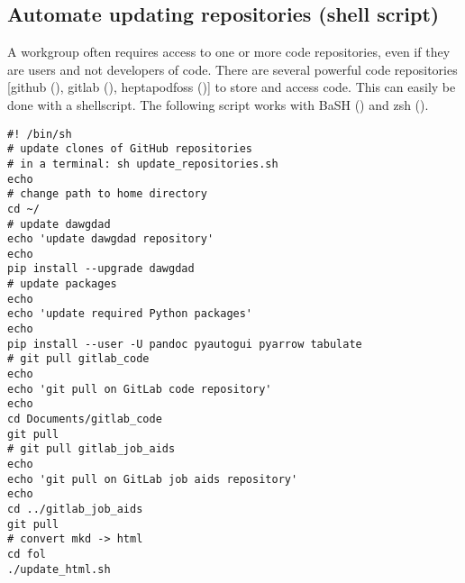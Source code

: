 \documentclass[10pt, letterpaper, twoside]{article}
\begin{document}
\subsection{Automate updating repositories (shell script)}\label{sec:automate_updating_repositories}
A workgroup often requires access to one or more code repositories, even if they are users and not developers of code. There are several powerful code repositories [\Gls{github} (\cite{github}), \Gls{gitlab} (\cite{gitlab}), \gls{heptapodfoss} (\cite{heptapodfoss})] to store and access code. This can easily be done with a \gls{shellscript}. The following script works with BaSH (\cite{bash}) and zsh (\cite{zsh}).
\begin{footnotesize}
\begin{verbatim}
#! /bin/sh
# update clones of GitHub repositories
# in a terminal: sh update_repositories.sh
echo
# change path to home directory
cd ~/
# update dawgdad
echo 'update dawgdad repository'
echo
pip install --upgrade dawgdad
# update packages
echo
echo 'update required Python packages'
echo
pip install --user -U pandoc pyautogui pyarrow tabulate
# git pull gitlab_code
echo
echo 'git pull on GitLab code repository'
echo
cd Documents/gitlab_code
git pull
# git pull gitlab_job_aids
echo
echo 'git pull on GitLab job aids repository'
echo
cd ../gitlab_job_aids
git pull
# convert mkd -> html
cd fol
./update_html.sh
\end{verbatim}
\end{footnotesize}
\end{document}
